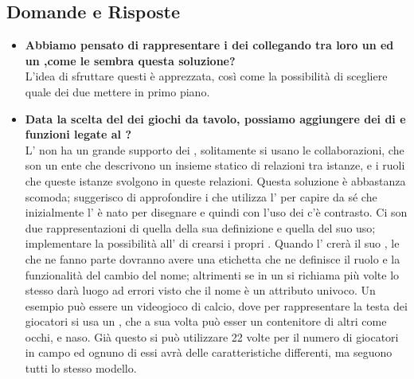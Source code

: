 	  \subsection{Domande e Risposte}
	   \begin{itemize}
	   
	   	   	\item 
	   		\textbf{Abbiamo pensato di rappresentare i  dei  collegando tra loro un  ed un ,come le sembra questa soluzione?} \\
	    	\justifying     		
L'idea di sfruttare questi  è apprezzata, così come la possibilità di scegliere quale dei due  mettere in primo piano.\\
	   	\item 
	   		\textbf{Data la scelta del  dei giochi da tavolo, possiamo aggiungere dei  di  e funzioni legate al ?} \\
	    	\justifying     		
L' non ha un grande supporto dei , solitamente si usano le collaborazioni, che son un ente che descrivono un insieme statico di relazioni tra istanze, e i ruoli che queste istanze svolgono in queste relazioni. Questa soluzione è abbastanza scomoda; suggerisco di approfondire i  che utilizza l' per capire da sé che inizialmente l' è nato per disegnare  e quindi con l'uso dei  c'è contrasto. 
Ci son due rappresentazioni di  quella della sua definizione e quella del suo uso; implementare la possibilità all' di crearsi i propri . Quando l' crerà il suo , le  che ne fanno parte dovranno avere una etichetta che ne definisce il ruolo e la funzionalità del cambio del nome; altrimenti se in un  si richiama più volte lo stesso  darà luogo ad errori visto che il nome è un attributo univoco. Un esempio può essere un videogioco di calcio, dove per rappresentare la testa dei giocatori si usa un , che a sua volta può esser un contenitore di altri  come occhi, e naso. Già questo  si può utilizzare 22 volte per il numero di giocatori in campo ed ognuno di essi avrà delle caratteristiche differenti, ma seguono tutti lo stesso modello.

\end{itemize}
